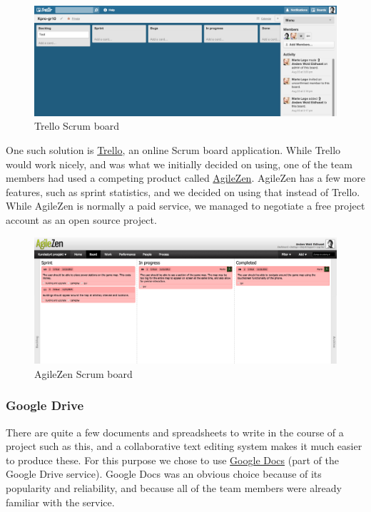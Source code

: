 \begin{figure}[htb]
  \centering
  \includegraphics[width=1\textwidth]{pictures/trello.png}
  \caption{Trello Scrum board}
\end{figure}

One such solution is \href{https://trello.com}{Trello}, an online Scrum
board application. While Trello would work nicely, and was what we initially
decided on using, one of the team members had used a competing product called
\href{http://www.agilezen.com/}{AgileZen}. AgileZen has a few more features,
such as sprint statistics, and we decided on using that instead of Trello.
While AgileZen is normally a paid service, we managed to negotiate a free
project account as an open source project.

\begin{figure}[htb]
  \centering
  \includegraphics[width=1\textwidth]{pictures/agilezen.png}
  \caption{AgileZen Scrum board}
\end{figure}

\subsubsection{Google Drive}
There are quite a few documents and spreadsheets to write in the course
of a project such as this, and a collaborative text editing system
makes it much easier to produce these. For this purpose we chose to use
\href{https://drive.google.com}{Google Docs} (part of the Google Drive
service). Google Docs was an obvious choice because of its popularity and
reliability, and because all of the team members were already familiar with the
service.

